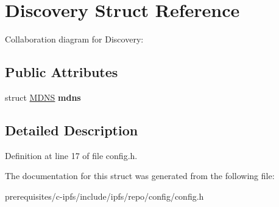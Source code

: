 \hypertarget{struct_discovery}{}\section{Discovery Struct Reference}
\label{struct_discovery}


Collaboration diagram for Discovery\+:
\subsection*{Public Attributes}
\begin{DoxyCompactItemize}
\item 
\mbox{\label{struct_discovery_a38e191da2473c647e5a3e8ad635fcf10}} 
struct \mbox{\hyperlink{struct_m_d_n_s}{M\+D\+NS}} {\bfseries mdns}
\end{DoxyCompactItemize}


\subsection{Detailed Description}


Definition at line 17 of file config.\+h.



The documentation for this struct was generated from the following file\+:\begin{DoxyCompactItemize}
\item 
prerequisites/c-\/ipfs/include/ipfs/repo/config/config.\+h\end{DoxyCompactItemize}
